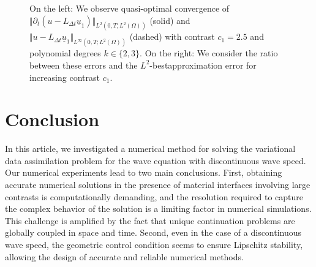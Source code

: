 \documentclass[sn-mathphys-num]{sn-jnl}
\numberwithin{equation}{section}
\newcommand{\ul}{\underline{u}}
\newcommand{\dt}{\partial_t}
\begin{document}
\begin{figure}[!htbp]
\begin{center}
    \end{center}
    \caption{On the left: We observe quasi-optimal convergence of $\Vert \dt(u-L_{\Delta t} \ul_1) \Vert_{L^2(0,T;L^2(\Omega))}$ (solid) and $\Vert u-L_{\Delta t} \ul_1 \Vert_{L^\infty(0,T;L^2(\Omega))}$ (dashed) with contrast $c_1 = 2.5$ and polynomial degrees $k \in \{2,3\}$. On the right: We consider the ratio between these errors and the $L^2$-bestapproximation error for increasing contrast $c_1$.}
    \label{fig:2DjumpCoefs}
  \end{figure}


\section{Conclusion}
In this article, we investigated a numerical method for solving the variational data assimilation problem for the wave equation with discontinuous wave speed. Our numerical experiments lead to two main conclusions. First, obtaining accurate numerical solutions in the presence of material interfaces involving large contrasts is computationally demanding, and the resolution required to capture the complex behavior of the solution is a limiting factor in numerical simulations. This challenge is amplified by the fact that unique continuation problems are globally coupled in space and time. Second, even in the case of a discontinuous wave speed, the geometric control condition seems to ensure Lipschitz stability, allowing the design of accurate and reliable numerical methods. 



\end{document}
